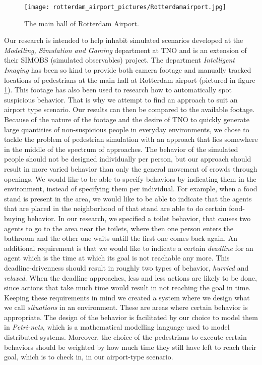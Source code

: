 \documentclass[11pt, a4paper]{book}
\begin{document}
\begin{figure}
\begin{center}
\texttt{[image: rotterdam\_airport\_pictures/Rotterdamairport.jpg]}

\end{center}
\caption{The main hall of Rotterdam Airport.}
\label{fig:airportimage}
\end{figure}

Our research is intended to help inhabit simulated scenarios developed at the \emph{Modelling, Simulation and Gaming} department at TNO and is an extension of their SIMOBS (simulated observables) project. The department \emph{Intelligent Imaging} has been so kind to provide both camera footage and manually tracked locations of pedestrians at the main hall at Rotterdam airport (pictured in figure \ref{fig:airportimage}). This footage has also been used to research how to automatically spot suspicious behavior. That is why we attempt to find an approach to suit an airport type scenario. Our results can then be compared to the available footage. Because of the nature of the footage and the desire of TNO to quickly generate large quantities of non-suspicious people in everyday environments, we chose to tackle the problem of pedestrian simulation with an approach that lies somewhere in the middle of the spectrum of approaches. The behavior of the simulated people should not be designed individually per person, but our approach should result in more varied behavior than only the general movement of crowds through openings. We would like to be able to specify behaviors by indicating them in the environment, instead of specifying them per individual. For example, when a food stand is present in the area, we would like to be able to indicate that the agents that are placed in the neighborhood of that stand are able to do certain food-buying behavior. In our research, we specified a toilet behavior, that causes two agents to go to the area near the toilets, where then one person enters the bathroom and the other one waits untill the first one comes back again.
An additional requirement is that we would like to indicate a certain \emph{deadline} for an agent which is the time at which its goal is not reachable any more. This deadline-drivenness should result in roughly two types of behavior, \emph{hurried} and \emph{relaxed}. When the deadline approaches, less and less actions are likely to be done, since actions that take much time would result in not reaching the goal in time.\\
Keeping these requirements in mind we created a system where we design what we call \emph{situations} in an environment. These are areas where certain behavior is appropriate. The design of the behavior is facilitated by our choice to model them in \emph{Petri-nets}, which is a mathematical modelling language used to model distributed systems. Moreover, the choice of the pedestrians to execute certain behaviors should be weighted by how much time they still have left to reach their goal, which is to check in, in our airport-type scenario.
\end{document}
